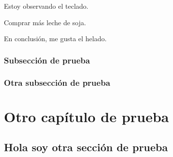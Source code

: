 \begin{remark}[Observación]
Estoy observando el teclado.
\end{remark}

\begin{note}
Comprar más leche de soja.
\end{note}
\begin{conclusion}
En conclusión, me gusta el helado.
\end{conclusion}

\lipsum[4-7]
\subsection{Subsección de prueba}
\lipsum[8]
\subsection{Otra subsección de prueba}
\lipsum[9-20]
\chapter{Otro capítulo de prueba}
\lipsum[10]
\section{Hola soy otra sección de prueba}
\lipsum[11-40]